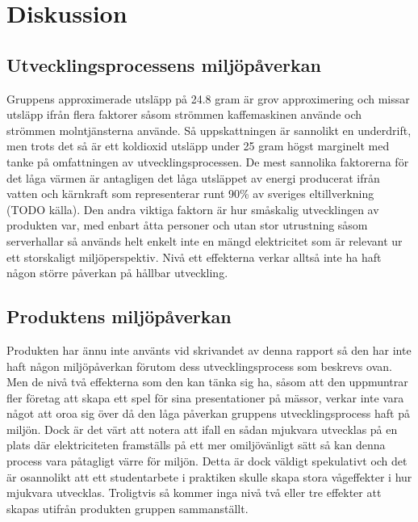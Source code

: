 
\section{Diskussion}
\label{sec:joel_a-discussion}

\subsection{Utvecklingsprocessens miljöpåverkan}
Gruppens approximerade utsläpp på 24.8 gram  är grov approximering och missar utsläpp ifrån flera faktorer såsom strömmen kaffemaskinen använde och strömmen molntjänsterna använde. Så uppskattningen är sannolikt en underdrift, men trots det så är ett koldioxid utsläpp under 25 gram högst marginelt med tanke på omfattningen av utvecklingsprocessen. De mest sannolika faktorerna för det låga värmen är antagligen det låga  utsläppet av energi producerat ifrån vatten och kärnkraft som representerar runt 90\% av sveriges eltillverkning (TODO källa). Den andra viktiga faktorn är hur småskalig utvecklingen av produkten var, med enbart åtta personer och utan stor utrustning såsom serverhallar så används helt enkelt inte en mängd elektricitet som är relevant ur ett storskaligt miljöperspektiv. Nivå ett effekterna verkar alltså inte ha haft någon större påverkan på hållbar utveckling.


\subsection{Produktens miljöpåverkan}
Produkten har ännu inte använts vid skrivandet av denna rapport så den har inte haft någon miljöpåverkan förutom dess utvecklingsprocess som beskrevs ovan. Men de nivå två effekterna som den kan tänka sig ha, såsom att den uppmuntrar fler företag att skapa ett spel för sina presentationer på mässor, verkar inte vara något att oroa sig över då den låga påverkan gruppens utvecklingsprocess haft på miljön. Dock är det värt att notera att ifall en sådan mjukvara utvecklas på en plats där elektriciteten framställs på ett mer omiljövänligt sätt så kan denna process vara påtagligt värre för miljön. Detta är dock väldigt spekulativt och det är osannolikt att ett studentarbete i praktiken skulle skapa stora vågeffekter i hur mjukvara utvecklas. Troligtvis så kommer inga nivå två eller tre effekter att skapas utifrån produkten gruppen sammanställt.


